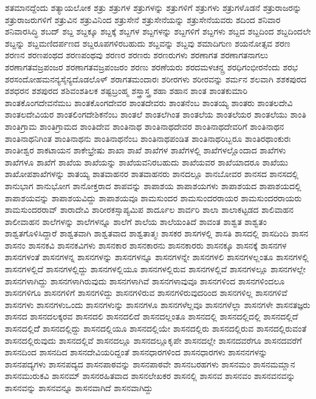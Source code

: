 {ಶತಮಾನದ್ದೆಂದು
ಶತ್ಯಾಯಲೋಕ
ಶತ್ರು
ಶತ್ರುಗಳ
ಶತ್ರುಗಳನ್ನು
ಶತ್ರುಗಳಿಗೆ
ಶತ್ರುಗಳು
ಶತ್ರುಗಳೊಡನೆ
ಶತ್ರುರಾಜರನ್ನು
ಶತ್ರುರಾಜರುಗಳಿಗೆ
ಶತ್ರುವಿನ
ಶತ್ರುವಿನಿಂದ
ಶತ್ರುಸೇನೆ
ಶತ್ರುಸೇನೆಯನ್ನು
ಶತ್ರುಸೇನೆಯವರು
ಶದಿಂದ
ಶನಿವಾರ
ಶನಿವಾರಸಿದ್ಧಿ
ಶಬದ್
ಶಬ್ದ
ಶಬ್ದಕ್ಕೂ
ಶಬ್ದಕ್ಕೆ
ಶಬ್ದಗಳ
ಶಬ್ದಗಳನ್ನು
ಶಬ್ದಗಳಿಗೆ
ಶಬ್ದಗಳು
ಶಬ್ದದ
ಶಬ್ದದಿಂದ
ಶಬ್ದದಿಂದಲೇ
ಶಬ್ದನ್ನು
ಶಬ್ದಮಣಿದರ್ಪಣದ
ಶಬ್ದರೂಪಗಳಿರಬಹುದು
ಶಬ್ದವನ್ನು
ಶಬ್ದವು
ಶಮಾದಿಗುಣ
ಶಯನೋತ್ಸವ
ಶರಣ
ಶರಣನ
ಶರಣಪಂಥದ
ಶರಣಪಂಥವು
ಶರಣರ
ಶರಣರು
ಶರಣರುಗಳು
ಶರಣಾಗತ
ಶರಣಾಗತನಾಗಲು
ಶರಣಾಗತವಜ್ರಪಂಜರ
ಶರಣಾಗತವಜ್ರಪಂಜರಂ
ಶರಣು
ಶರಣೆಯರು
ಶರದಮಳಚನ್ದ್ರ
ಶರಧಿಗಂಭೀರನೆಂದು
ಶರಭ
ಶರಸಂದೋಹಮನನ್ಯಸೈನ್ಯದೊಡಲೊಳ್
ಶರಾಗತಮಂದಾರಃ
ಶರೀರಗಳು
ಶರೀರವನ್ನು
ಶರ್ಮನ
ಶಲವಾಗಿ
ಶಶಕಪುರದ
ಶಶಧರನ
ಶಶಪುರದ
ಶಶಿವಂಶತಿಲಕ
ಶಷ್ಟಬ್ರಂಹ್ಮ
ಶಸ್ತ್ರಾಸ್ತ್ರ
ಶಹಾ
ಶಹಾನ
ಶಾಂತ
ಶಾಂತಕುಮಾರಿ
ಶಾಂತಕೊಂಗದೇವನೆಮಬ
ಶಾಂತಕೊಂಗದೇವರ
ಶಾಂತದೇವರು
ಶಾಂತನೆಂಬ
ಶಾಂತಯ್ಯ
ಶಾಂತರು
ಶಾಂತಲದೇವಿ
ಶಾಂತಲದೇವಿಯರ
ಶಾಂತಲಿಂಗದೇಶಿಕನೆಂಬ
ಶಾಂತಲೆ
ಶಾಂತಲೆಗಿಂತ
ಶಾಂತಲೆಯ
ಶಾಂತಲೆಯರ
ಶಾಂತಲೆಯು
ಶಾಂತಿ
ಶಾಂತಿಗ್ರಾಮ
ಶಾಂತಿಗ್ರಾಮದ
ಶಾಂತಿದೇವ
ಶಾಂತಿನಾಥ
ಶಾಂತಿನಾಥದೇವರ
ಶಾಂತಿನಾಥದೇವರಿಗೆ
ಶಾಂತಿನಾಥನ
ಶಾಂತಿನಾಥನಿಗಿಂತ
ಶಾಂತಿನಾಥನು
ಶಾಂತಿನಾಥನೆಂಬ
ಶಾಂತಿನಾಥಪಂಡಿತ
ಶಾಂತಿನಾಥರಿಬ್ಬರೂ
ಶಾಂತಿರಥಾಂಕುರಃ
ಶಾಂತೀಶ್ವರ
ಶಾಕಟಾಯನ
ಶಾಕೇಭ್ರೇಷು
ಶಾಖಾ
ಶಾಖೆ
ಶಾಖೆಗಳ
ಶಾಖೆಗಳಲ್ಲಿ
ಶಾಖೆಗಳಲ್ಲೊಂದಾದ
ಶಾಖೆಗಳು
ಶಾಖೆಗಳೂ
ಶಾಖೆಗೆ
ಶಾಖೆಯ
ಶಾಖೆಯನ್ನು
ಶಾಖೆಯವನಿರಬಹುದು
ಶಾಖೆಯವರ
ಶಾಖೆಯಾದರೂ
ಶಾಖೆಯು
ಶಾಖೋಪಶಾಖೆಗಳನ್ನು
ಶಾತಯ್ಯ
ಶಾತವಾಹನರ
ಶಾತವಾಹನರು
ಶಾನದಲ್ಲೂ
ಶಾನಬೋವರ
ಶಾನಸದ
ಶಾನಸದಲ್ಲಿ
ಶಾನುಭಾಗ
ಶಾನುಭೋಗ
ಶಾನೋಕ್ತರಾದ
ಶಾಪವನ್ನು
ಶಾಪಾಶಯ
ಶಾಪಾಶಯಗಳು
ಶಾಪಾಶಯದ
ಶಾಪಾಶಯದಲ್ಲಿ
ಶಾಪಾಶಯವನ್ನು
ಶಾಪಾಶಯವಿದ್ದು
ಶಾಪಾಶಯವೂ
ಶಾಮಸುಂದರ
ಶಾಮಸುಂದರರಾಯರ
ಶಾಮಸುಂದರರಾಯರು
ಶಾಮಸುಂದರರಾವ್
ಶಾರಾದೇವಿ
ಶಾರೀರಕಸ್ಸಾಪ್ಯಮಿಪ
ಶಾರ್ದೂಲ
ಶಾರ್ವರಿ
ಶಾಲಾ
ಶಾಲಾಕಟ್ಟಡದ
ಶಾಲಿವಾಹನ
ಶಾಲೀವಾಹನ
ಶಾಲೆಗಳನ್ನು
ಶಾಲೆಗಳನ್ನೂ
ಶಾಲೆಗೆ
ಶಾಲೆಯ
ಶಾಲೆಯಂತಿದೆ
ಶಾವಂತ
ಶಾಶ್ವತ
ಶಾಶ್ವತಂ
ಶಾಶ್ವತಗೊಳಿಸಿದ್ದಾರೆ
ಶಾಶ್ವತವಾಗಿ
ಶಾಶ್ವತವಾದ
ಶಾಶ್ವತಾತ್ಮಃ
ಶಾಸಕರ
ಶಾಸಗಳಲ್ಲಿ
ಶಾಸತಿ
ಶಾಸದಲ್ಲಿ
ಶಾಸದಿಂದಿ
ಶಾಸನ
ಶಾಸನಂ
ಶಾಸನಕವಿ
ಶಾಸನಕವಿಗಳು
ಶಾಸನಕಾರ
ಶಾಸನಕಾರನು
ಶಾಸನಕಾರರು
ಶಾಸನಕ್ಕೂ
ಶಾಸನಕ್ಕೆ
ಶಾಸನಗಳ
ಶಾಸನಗಳಂತೆ
ಶಾಸನಗಳನ್ನ
ಶಾಸನಗಳನ್ನು
ಶಾಸನಗಳನ್ನೂ
ಶಾಸನಗಳನ್ನೇ
ಶಾಸನಗಳಲಿ
ಶಾಸನಗಳಲ್ಲಂತೂ
ಶಾಸನಗಳಲ್ಲಿ
ಶಾಸನಗಳಲ್ಲಿದೆ
ಶಾಸನಗಳಲ್ಲಿದ್ದು
ಶಾಸನಗಳಲ್ಲಿಯೂ
ಶಾಸನಗಳಲ್ಲಿರುವ
ಶಾಸನಗಳಲ್ಲಿವೆ
ಶಾಸನಗಳಲ್ಲೂ
ಶಾಸನಗಳಲ್ಲೇ
ಶಾಸನಗಳಾಗಿದ್ದು
ಶಾಸನಗಳಾಗಿರುವುದು
ಶಾಸನಗಳಾಗಿವೆ
ಶಾಸನಗಳಾವುವೂ
ಶಾಸನಗಳಿಂದ
ಶಾಸನಗಳಿಂದಲೂ
ಶಾಸನಗಳಿಗೂ
ಶಾಸನಗಳಿಗೆ
ಶಾಸನಗಳಿದ್ದು
ಶಾಸನಗಳಿರುವ
ಶಾಸನಗಳಿರುವುದರಿಂದ
ಶಾಸನಗಳಿಲ್ಲ
ಶಾಸನಗಳಿವೆ
ಶಾಸನಗಳು
ಶಾಸನಗಳುಒಂದು
ಶಾಸನಗಳುನ್ನು
ಶಾಸನಗಳೂ
ಶಾಸನಗಳೆಲ್ಲವೂ
ಶಾಸನಗಳೆಲ್ಲಾ
ಶಾಸನಗಳೇ
ಶಾಸನತಜ್ಞರು
ಶಾಸನದ
ಶಾಸನದಲಕ್ಕರವ
ಶಾಸನದಲಿ
ಶಾಸನದಲಿದೆ
ಶಾಸನದಲ್ಲಂತೂ
ಶಾಸನದಲ್ಲಿ
ಶಾಸನದಲ್ಲಿದಲ್ಲಿ
ಶಾಸನದಲ್ಲಿದೆ
ಶಾಸನದಲ್ಲಿದೆೆ
ಶಾಸನದಲ್ಲಿದ್ದು
ಶಾಸನದಲ್ಲಿಯೂ
ಶಾಸನದಲ್ಲಿಯೇ
ಶಾಸನದಲ್ಲಿರು
ಶಾಸನದಲ್ಲಿರುವ
ಶಾಸನದಲ್ಲಿರುವಂತೆ
ಶಾಸನದಲ್ಲಿರುವುದು
ಶಾಸನದಲ್ಲಿವೆ
ಶಾಸನದಲ್ಲೂ
ಶಾಸನದಲ್ಲೂಕೃಪೇ
ಶಾಸನದಲ್ಲೇ
ಶಾಸನದವರೆಗೂ
ಶಾಸನದವರೆಗೆ
ಶಾಸನದಿಂದ
ಶಾಸನದಿದ
ಶಾಸನದೇವಿಯರಿದ್ದಂತೆ
ಶಾಸನಧಾರಗಳಿಂದ
ಶಾಸನಧಾರಗಳು
ಶಾಸನನಗಳನ್ನು
ಶಾಸನಪದ್ಯಗಳು
ಶಾಸನಪದ್ಯದ
ಶಾಸನಪಾಠವನ್ನು
ಶಾಸನಪಾಠವೇ
ಶಾಸನಬರಹಗಳು
ಶಾಸನಮಂ
ಶಾಸನಮಮ್ಲಾನ
ಶಾಸನಮುರುಕವಿ
ಶಾಸನಮ್
ಶಾಸನರಹಿತವಾದ
ಶಾಸನಲೇಖಕರ
ಶಾಸನಲ್ಲಿ
ಶಾಸನವ
ಶಾಸನವಂ
ಶಾಸನವನವನ್ನು
ಶಾಸನವನ್ನು
ಶಾಸನವನ್ನೂ
ಶಾಸನವಾಗಿದೆ
ಶಾಸನವಾಗಿದ್ದು
}
